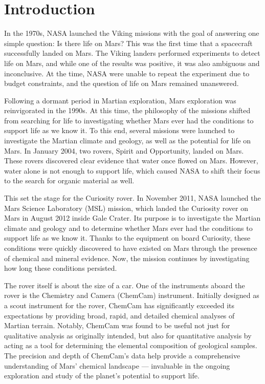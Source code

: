\section{Introduction}\label{sec:introduction}
In the 1970s, NASA launched the Viking missions with the goal of answering one simple question: Is there life on Mars?
This was the first time that a spacecraft successfully landed on Mars.
The Viking landers performed experiments to detect life on Mars, and while one of the results was positive, it was also ambiguous and inconclusive.
At the time, NASA were unable to repeat the experiment due to budget constraints, and the question of life on Mars remained unanswered.\cite{marsnasagov_vikings}

Following a dormant period in Martian exploration, Mars exploration was reinvigorated in the 1990s.
At this time, the philosophy of the missions shifted from searching for life to investigating whether Mars ever had the conditions to support life as we know it.
To this end, several missions were launched to investigate the Martian climate and geology, as well as the potential for life on Mars.
In January 2004, two rovers, Spirit and Opportunity, landed on Mars.
These rovers discovered clear evidence that water once flowed on Mars.
However, water alone is not enough to support life, which caused NASA to shift their focus to the search for organic material as well.\cite{marsnasagov_observer, marsnasagov_spirit_opportunity}

This set the stage for the Curiosity rover.
In November 2011, NASA launched the Mars Science Laboratory (MSL) mission, which landed the Curiosity rover on Mars in August 2012 inside Gale Crater.
Its purpose is to investigate the Martian climate and geology and to determine whether Mars ever had the conditions to support life as we know it.
Thanks to the equipment on board Curiosity, these conditions were quickly discovered to have existed on Mars through the presence of chemical and mineral evidence.\cite{chemcamNasaWebsite}
Now, the mission continues by investigating how long these conditions persisted.

The rover itself is about the size of a car.
One of the instruments aboard the rover is the Chemistry and Camera (ChemCam) instrument.
Initially designed as a scout instrument for the rover, ChemCam has significantly exceeded its expectations by providing broad, rapid, and detailed chemical analyses of Martian terrain.
Notably, ChemCam was found to be useful not just for qualitative analysis as originally intended, but also for quantitative analysis by acting as a tool for determining the elemental composition of geological samples.
The precision and depth of ChemCam's data help provide a comprehensive understanding of Mars' chemical landscape --- invaluable in the ongoing exploration and study of the planet's potential to support life.\cite{chemcamNasaWebsite}

